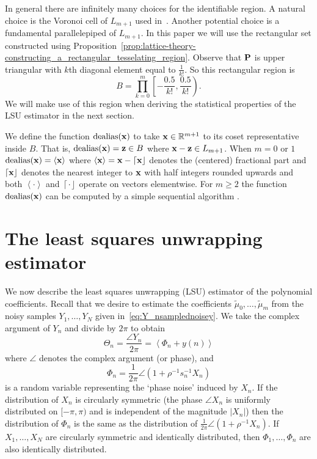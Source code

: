 \documentclass[aap]{imsart}
\newcommand{\reals}{{\mathbb R}}
\newcommand{\dealias}{\operatorname{dealias}}
\newcommand{\fracpart}[1]{\left\langle #1 \right\rangle}
\newcommand{\abs}[1]{\left\vert #1 \right\vert}
\newcommand{\round}[1]{{\left\lceil #1 \right\rfloor}}
\begin{document}
In general there are infinitely many choices for the identifiable region. A natural choice is the Voronoi cell of $L_{m+1}$ used in~\cite{McKilliam2009IndentifiabliltyAliasingPolyphase}. Another potential choice is a fundamental parallelepiped of $L_{m+1}$. In this paper we will use the rectangular set constructed using Proposition~\ref{prop:lattice-theory-constructing_a_rectangular_tesselating_region}. Observe that $\mathbf{P}$ is upper triangular with $k$th diagonal element equal to $\tfrac{1}{k!}$.  So this rectangular region is
\begin{equation}\label{eq:rectangular_identifiable_region}
B = \prod_{k=0}^{m}\left[ -\frac{0.5}{k!}, \frac{0.5}{k!}  \right).
\end{equation}
We will make use of this region when deriving the statistical properties of the LSU estimator in the next section. 

We define the function $\dealias(\xbf)$ to take $\xbf\in\reals^{m+1}$ to its coset representative inside $B$. That is, $\dealias(\xbf) = \zbf \in B$ where $\mathbf{x} - \mathbf{z} \in L_{m+1}$.  %
When $m = 0$ or $1$ $\dealias(\xbf) = \fracpart{\xbf}$ where $\fracpart{\xbf} = \xbf - \round{\xbf}$ denotes the (centered) fractional part and $\round{\xbf}$ denotes the nearest integer to $\mathbf{x}$ with half integers rounded upwards and both $\fracpart{\cdot}$ and $\round{\cdot}$ operate on vectors elementwise.  For $m \geq 2$ the function $\dealias(\xbf)$ can be computed by a simple sequential algorithm \cite[Sec. 7.2.1]{McKilliam2010thesis}.


\section{The least squares unwrapping estimator}\label{sec:least-squar-unwr}

We now describe the least squares unwrapping (LSU) estimator of the polynomial coefficients. Recall that we desire to estimate the coefficients $\tilde{\mu}_0, \dots, \tilde{\mu}_m$ from the noisy samples $Y_1, \dots, Y_N$ given in~\eqref{eq:Y_nsamplednoisey}.  We take the complex argument of $Y_n$ and divide by $2\pi$ to obtain
\begin{equation}\label{eq:noise_circ_poly}
\Theta_n = \frac{\angle{Y_n}}{2\pi} = \fracpart{ \Phi_n + y(n) }
\end{equation}
where $\angle$ denotes the complex argument (or phase), and 
\[
\Phi_n = \frac{1}{2\pi}\angle(1 + \rho^{-1}s_n^{-1}X_n)
\] 
is a random variable representing the `phase noise' induced by $X_n$.  If the distribution of $X_n$ is circularly symmetric (the phase $\angle X_n$ is uniformly distributed on $[-\pi, \pi)$ and is independent of the magnitude $\abs{X_n}$) then the distribution of $\Phi_n$ is the same as the distribution of $\tfrac{1}{2\pi}\angle(1 + \rho^{-1}X_n)$.  If $X_1, \dots, X_N$ are circularly symmetric and identically distributed, then $\Phi_1, \dots, \Phi_n$ are also identically distributed.
\end{document}
